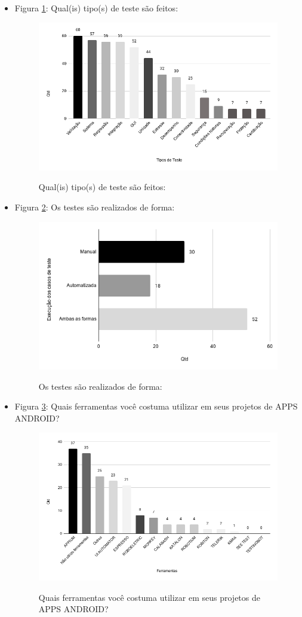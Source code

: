 \begin{itemize}
  
     \item Figura \ref{figure:s_tipostestes}: Qual(is) tipo(s) de teste são feitos:
    \begin{figure}[!htb]
    \centering
    \includegraphics[width=.55\textwidth]{images/s_tipostestes.png}
    \label{figure:s_tipostestes}
    \caption{Qual(is) tipo(s) de teste são feitos:}
    \end{figure}
    
    
     \item Figura \ref{figure:s_formatestes}: Os testes são realizados de forma:
    \begin{figure}[!htb]
    \centering
    \includegraphics[width=.55\textwidth]{images/s_formatestes.png}
    \label{figure:s_formatestes}
    \caption{Os testes são realizados de forma:}
    \end{figure}    
    
    
    \item Figura \ref{figure:s_ferramentastestes}: Quais ferramentas você costuma utilizar em seus projetos de APPS ANDROID?
    \begin{figure}[!htb]
    \centering
    \includegraphics[width=.55\textwidth]{images/s_ferramentastestes.png}
    \label{figure:s_ferramentastestes}
    \caption{Quais ferramentas você costuma utilizar em seus projetos de APPS ANDROID?}
    \end{figure}
    

\end{itemize}
